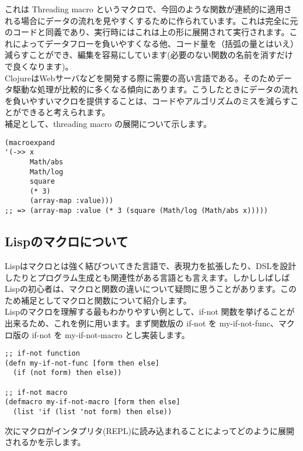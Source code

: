 \documentclass[a4paper, dvipdfmx, 12pt]{article}
\begin{document}
これは Threading macro というマクロで、今回のような関数が連続的に適用される場合にデータの流れを見やすくするために作られています。これは完全に元のコードと同義であり、実行時にはこれは上の形に展開されて実行されます。これによってデータフローを負いやすくなる他、コード量を（括弧の量とはいえ）減らすことができ、編集を容易にしています(必要のない関数の名前を消すだけで良くなります)。\\

ClojureはWebサーバなどを開発する際に需要の高い言語である。そのためデータ駆動な処理が比較的に多くなる傾向にあります。こうしたときにデータの流れを負いやすいマクロを提供することは、コードやアルゴリズムのミスを減らすことができると考えられます。\\

補足として、threading macro の展開について示します。\\
\begin{verbatim}
(macroexpand  
'(->> x 
      Math/abs 
      Math/log
      square 
      (* 3) 
      (array-map :value)))
;; => (array-map :value (* 3 (square (Math/log (Math/abs x)))))
\end{verbatim}

\subsection{Lispのマクロについて}
\label{sec:org5194b0d}
Lispはマクロとは強く結びついてきた言語で、表現力を拡張したり、DSLを設計したりとプログラム生成とも関連性がある言語とも言えます。しかししばしばLispの初心者は、マクロと関数の違いについて疑問に思うことがあります。このため補足としてマクロと関数について紹介します。\\

Lispのマクロを理解する最もわかりやすい例として、if-not 関数を挙げることが出来るため、これを例に用います。まず関数版の if-not を my-if-not-func、マクロ版の if-not を my-if-not-macro とし実装します。\\

\begin{verbatim}
;; if-not function 
(defn my-if-not-func [form then else] 
  (if (not form) then else))

;; if-not macro 
(defmacro my-if-not-macro [form then else]
  (list 'if (list 'not form) then else))
\end{verbatim}

次にマクロがインタプリタ(REPL)に読み込まれることによってどのように展開されるかを示します。\\
\end{document}
